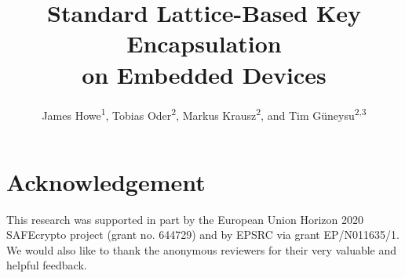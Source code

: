 \documentclass[preprint]{iacrtrans}
\begin{document}
%

\title{Standard Lattice-Based Key Encapsulation\\ on Embedded Devices}

\author{
James Howe\textsuperscript{1}, Tobias Oder\textsuperscript{2}, Markus Krausz\textsuperscript{2}, and Tim G\"uneysu\textsuperscript{2,3}
}



\maketitle









\section*{Acknowledgement}
This research was supported in part by the European Union Horizon 2020 SAFEcrypto project (grant no. 644729) and by EPSRC via grant EP/N011635/1. We would also like to thank the anonymous reviewers for their very valuable and helpful feedback.




\end{document}
